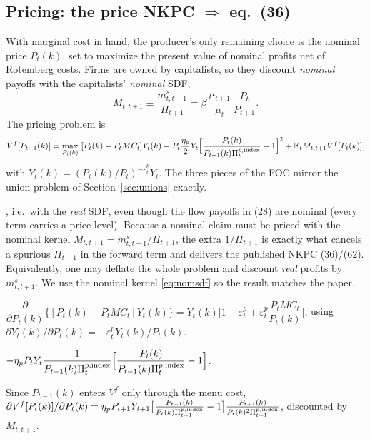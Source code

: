 \subsection{Pricing: the price NKPC \texorpdfstring{$\Rightarrow$}{=>} eq.\ (36)}
With marginal cost in hand, the producer's only remaining choice is the nominal price $P_t(k)$, set to
maximize the present value of nominal profits net of Rotemberg costs. Firms are owned by capitalists,
so they discount \emph{nominal} payoffs with the capitalists' \emph{nominal} SDF,
\begin{equation}\label{eq:nomsdf}
M_{t,t+1}\equiv\frac{m^s_{t,t+1}}{\Pi_{t+1}}
=\beta\,\frac{\mu_{t+1}}{\mu_t}\,\frac{P_t}{P_{t+1}} .
\end{equation}
The pricing problem is
\[
V^f[P_{t-1}(k)]=\max_{P_t(k)}\ [P_t(k)-P_tMC_t]Y_t(k)
-P_t\frac{\eta_p}{2}Y_t\Big[\frac{P_t(k)}{P_{t-1}(k)\Pi^{p,\Ind}_t}-1\Big]^2
+\E_t M_{t,t+1}V^f[P_t(k)],
\]
with $Y_t(k)=(P_t(k)/P_t)^{-\varepsilon^p_t}Y_t$. The three pieces of the FOC mirror the union
problem of Section~\ref{sec:unions} exactly.

\begin{remark}\label{rem:nomsdf}
, i.e.\ with
the \emph{real} SDF, even though the flow payoffs in (28) are nominal (every term carries a price
level). Because a nominal claim must be priced with the nominal kernel $M_{t,t+1}=m^s_{t,t+1}/\Pi_{t+1}$,
the extra $1/\Pi_{t+1}$ is exactly what cancels a spurious $\Pi_{t+1}$ in the forward term and delivers
the published NKPC (36)/(62). Equivalently, one may deflate the whole problem and discount \emph{real}
profits by $m^s_{t,t+1}$. We use the nominal kernel \eqref{eq:nomsdf} so the result matches the paper.
\end{remark}

$\dfrac{\partial}{\partial P_t(k)}\big\{[P_t(k)-P_tMC_t]Y_t(k)\big\}
=Y_t(k)\Big[1-\varepsilon^p_t+\varepsilon^p_t\dfrac{P_tMC_t}{P_t(k)}\Big]$, using
$\partial Y_t(k)/\partial P_t(k)=-\varepsilon^p_tY_t(k)/P_t(k)$.

$-\eta_pP_tY_t\dfrac{1}{P_{t-1}(k)\Pi^{p,\text{index}}_t}\Big[\dfrac{P_t(k)}{P_{t-1}(k)\Pi^{p,\text{index}}_t}-1\Big]$.

Since $P_{t-1}(k)$ enters $V^f$ only through the menu cost,
$\partial V^f[P_t(k)]/\partial P_t(k)
=\eta_pP_{t+1}Y_{t+1}\big[\tfrac{P_{t+1}(k)}{P_t(k)\Pi^{p,\text{index}}_{t+1}}-1\big]
\tfrac{P_{t+1}(k)}{P_t(k)^2\Pi^{p,\text{index}}_{t+1}}$, discounted by $M_{t,t+1}$.

